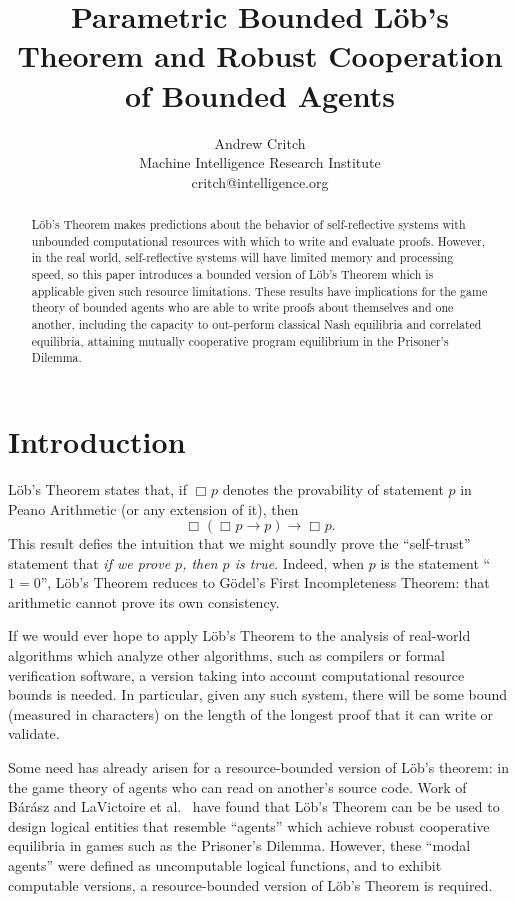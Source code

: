 \documentclass[onecolumn]{miri-tech-article}
\title{Parametric Bounded L\"{o}b's Theorem and Robust Cooperation of Bounded Agents}
\author{Andrew Critch \\ Machine Intelligence Research Institute \\ critch@intelligence.org}
\numberwithin{equation}{section}
\theoremstyle{definition}
\newcommand{\bx}[1]{\Box_{#1}}
\renewcommand{\implies}{\rightarrow}
\renewcommand{\-}{^{-1}}
\begin{document}
\publishingnote{}

\maketitle

\begin{abstract}
L\"{o}b's Theorem makes predictions about the behavior of self-reflective systems with unbounded computational resources with which to write and evaluate proofs.  However, in the real world, self-reflective systems will have limited memory and processing speed, so this paper introduces a bounded version of L\"{o}b's Theorem which is applicable given such resource limitations.  
These results have implications for the game theory of bounded agents who are able to write proofs about themselves and one another, including the capacity to out-perform classical Nash equilibria and correlated equilibria, attaining mutually cooperative program equilibrium in the Prisoner's Dilemma.
\end{abstract}

\section{Introduction}\label{sec:bo}

L\"{o}b's Theorem states that, if $\bx{}p$ denotes the provability of statement $p$ in Peano Arithmetic (or any extension of it), then 
\[
\bx{}(\bx{}p \implies p) \implies \bx{}p.
\]
This result defies the intuition that we might soundly prove the ``self-trust'' statement that {\em if we prove $p$, then $p$ is true}.  Indeed, when $p$ is the statement ``$1=0$'', L\"{o}b's Theorem reduces to G\"{o}del's First Incompleteness Theorem: that arithmetic cannot prove its own consistency.

If we would ever hope to apply L\"{o}b's Theorem to the analysis of real-world algorithms which analyze other algorithms, such as compilers or formal verification software, a version taking into account computational resource bounds is needed.  In particular, given any such system, there will be some bound (measured in characters) on the length of the longest proof that it can write or validate.

Some need has already arisen for a resource-bounded version of L\"{o}b's theorem: in the game theory of agents who can read on another's source code.  Work of B\'{a}r\'{a}sz and LaVictoire et al.~\cite{Barasz:2014:RobustCooperation}\cite{LaVictoire:2014:PrisDilemmaLob} have found that L\"{o}b's Theorem can be be used to design logical entities that resemble ``agents'' which achieve robust cooperative equilibria in games such as the Prisoner's Dilemma.  However, these ``modal agents'' were defined as uncomputable logical functions, and to exhibit computable versions, a resource-bounded version of L\"{o}b's Theorem is required.
\end{document}

